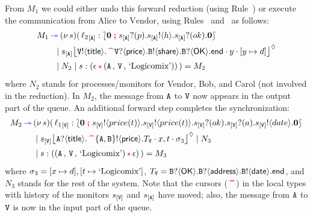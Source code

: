 \documentclass[runningheads,plain]{llncs}
\begin{document}
From $M_1$ we could either undo this forward reduction (using Rule~)
or execute the communication from $\text{Alice}$ to $\text{Vendor}$,
using Rules~ and~ as 
follows:
\begin{align*}
M_1  \fw & \news{s}(\,  \np{\key{{\loc_2}}{\pA}}{ \conf{\inact}{\binp{\epA}{p}\bout{\epA}{h}\binp{\epA}{ok}\inact}} 
\\
& \!\!\!\!\Par 
\hmoni{\ep{s}{\pA}}{\ltout{\pS}{\mathsf{title}}{\past \ltinp{\pS}{\mathsf{price}}{\ltout{B}{\mathsf{share}}{\ltinp{B}{\mathsf{OK}}{\lend}}}}}{y}{\upd{y}{d}} 
\\
& \!\!\!\!\Par N_2 \Par \codah{s}{\emp}{\valueq{\pA}{\pS}{\exBook}}{}~)  = M_2
\end{align*}
where $N_2$ stands for  processes/monitors for Vendor, Bob, and Carol (not involved in the reduction). 
In $M_2$, the message from $\mathtt{A}$ to $\mathtt{V}$ now appears in the output part of the queue.
An additional forward step completes the synchronization:
\begin{align*}
M_2 \textcolor{blue}{\,\twoheadrightarrow\,} & (\nu\, s)(\,  {{\ell_1}}_{[\mathtt{V}]}: \lbag \mathbf{0} \; \textcolor{magenta}{\textbf{;}}\; s_{[\mathtt{V}]} ! \langle price(t) \rangle . s_{[\mathtt{V}]} ! \langle price(t) \rangle .s_{[\mathtt{V}]} ? (ok) .  s_{[\mathtt{V}]} ? (a) . s_{[\mathtt{V}]} ! \langle date \rangle .\mathbf{0}  \rbag 
\\
& \;|\; 
{s_{[\mathtt{V}]}\mbox{{\large $\lfloor$}} \textcolor{black}{\mathtt{A}?\langle\mathsf{title}\rangle.\,\textcolor{magenta}{\text{\textbf{\textasciicircum\!\!\textasciicircum}}} \mathtt{\{A,B\}}!\langle\mathsf{price}\rangle.T_\mathtt{V}}\cdot x,t\cdot \sigma_3 \mbox{{\large $\rfloor$}}^{\lozenge}}  \;|\; N_3
\\
&  \;|\; s:((\mathtt{A} \,,\, \mathtt{V} \,,\,\text{`Logicomix'})\,\textcolor{magenta}{\mathbf{\star}}\,\epsilon)\!~)  = M_3
\end{align*}
where 
$\sigma_3  = [x\mapsto d],[t\mapsto \text{`Logicomix'}]$,
$T_\mathsf{\mathtt{V}}  = \mathtt{B}?\langle\mathsf{OK}\rangle.\mathtt{B}?\langle\mathsf{address}\rangle.\mathtt{B}!\langle\mathsf{date}\rangle.\mathsf{end}$,
and $N_3$ stands for the %
rest of the system.
Note that the cursors ($\,\textcolor{magenta}{\text{\textbf{\textasciicircum\!\!\textasciicircum}}}$) in 
the local types with history of the
monitors $s_{[\mathtt{V}]}$ and $s_{[\mathtt{A}]}$ have moved; also, the message from $\mathtt{A}$ to $\mathtt{V}$ is now in the input part of the queue.
\end{document}
